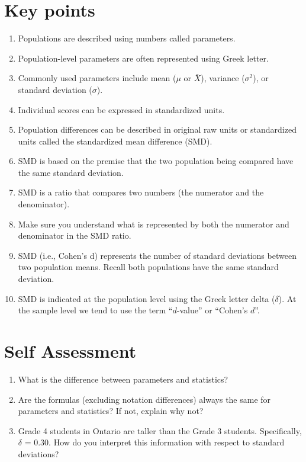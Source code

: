 \documentclass[
]{krantz}
\begin{document}
\newpage

\hypertarget{key-points}{%
\section{Key points}\label{key-points}}

\begin{enumerate}
\def\labelenumi{\arabic{enumi}.}
\item
  Populations are described using numbers called parameters.
\item
  Population-level parameters are often represented using Greek letter.
\item
  Commonly used parameters include mean (\(\mu\) or \(\bar{X}\)), variance (\(\sigma^2\)), or standard deviation (\(\sigma\)).
\item
  Individual scores can be expressed in standardized units.
\item
  Population differences can be described in original raw units or standardized units called the standardized mean difference (SMD).
\item
  SMD is based on the premise that the two population being compared have the same standard deviation.
\item
  SMD is a ratio that compares two numbers (the numerator and the denominator).
\item
  Make sure you understand what is represented by both the numerator and denominator in the SMD ratio.
\item
  SMD (i.e., Cohen's d) represents the number of standard deviations between two population means. Recall both populations have the same standard deviation.
\item
  SMD is indicated at the population level using the Greek letter delta (\(\delta\)). At the sample level we tend to use the term ``\(d\)-value'' or ``Cohen's \(d\)''.
\end{enumerate}

\hypertarget{self-assessment}{%
\section{Self Assessment}\label{self-assessment}}

\begin{enumerate}
\def\labelenumi{\arabic{enumi}.}
\item
  What is the difference between parameters and statistics?
\item
  Are the formulas (excluding notation differences) always the same for parameters and statistics? If not, explain why not?
\item
  Grade 4 students in Ontario are taller than the Grade 3 students. Specifically, \(\delta\) = 0.30. How do you interpret this information with respect to standard deviations?
\end{enumerate}
\end{document}
